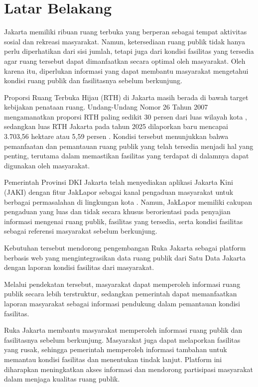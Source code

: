 \documentclass[conference]{IEEEtran}
\begin{document}
\section{Latar Belakang}

Jakarta memiliki ribuan ruang terbuka yang berperan sebagai tempat aktivitas sosial dan rekreasi masyarakat. %
Namun, ketersediaan ruang publik tidak hanya perlu diperhatikan dari sisi jumlah, tetapi juga dari kondisi fasilitas yang tersedia agar ruang tersebut dapat dimanfaatkan secara optimal oleh masyarakat. Oleh karena itu, diperlukan informasi yang dapat membantu masyarakat mengetahui kondisi ruang publik dan fasilitasnya sebelum berkunjung.

Proporsi Ruang Terbuka Hijau (RTH) di Jakarta masih berada di bawah target kebijakan penataan ruang. Undang-Undang Nomor 26 Tahun 2007 mengamanatkan proporsi RTH paling sedikit 30 persen dari luas wilayah kota \cite{uu262007}, sedangkan luas RTH Jakarta pada tahun 2025 dilaporkan baru mencapai 3.703,56 hektare atau 5,59 persen \cite{hukmana2026}. Kondisi tersebut menunjukkan bahwa pemanfaatan dan pemantauan ruang publik yang telah tersedia menjadi hal yang penting, terutama dalam memastikan fasilitas yang terdapat di dalamnya dapat digunakan oleh masyarakat.

Pemerintah Provinsi DKI Jakarta telah menyediakan aplikasi Jakarta Kini (JAKI) dengan fitur JakLapor sebagai kanal pengaduan masyarakat untuk berbagai permasalahan di lingkungan kota \cite{jaki}. Namun, JakLapor memiliki cakupan pengaduan yang luas dan tidak secara khusus berorientasi pada penyajian informasi mengenai ruang publik, fasilitas yang tersedia, serta kondisi fasilitas sebagai referensi masyarakat sebelum berkunjung.

Kebutuhan tersebut mendorong pengembangan Ruka Jakarta sebagai platform berbasis web yang mengintegrasikan data ruang publik dari Satu Data Jakarta \cite{satudata_rth} dengan laporan kondisi fasilitas dari masyarakat.

Melalui pendekatan tersebut, masyarakat dapat memperoleh informasi ruang publik secara lebih terstruktur, sedangkan pemerintah dapat memanfaatkan laporan masyarakat sebagai informasi pendukung dalam pemantauan kondisi fasilitas.

Ruka Jakarta membantu masyarakat memperoleh informasi ruang publik dan fasilitasnya sebelum berkunjung. Masyarakat juga dapat melaporkan fasilitas yang rusak, sehingga pemerintah memperoleh informasi tambahan untuk memantau kondisi fasilitas dan menentukan tindak lanjut. Platform ini diharapkan meningkatkan akses informasi dan mendorong partisipasi masyarakat dalam menjaga kualitas ruang publik.
\end{document}
